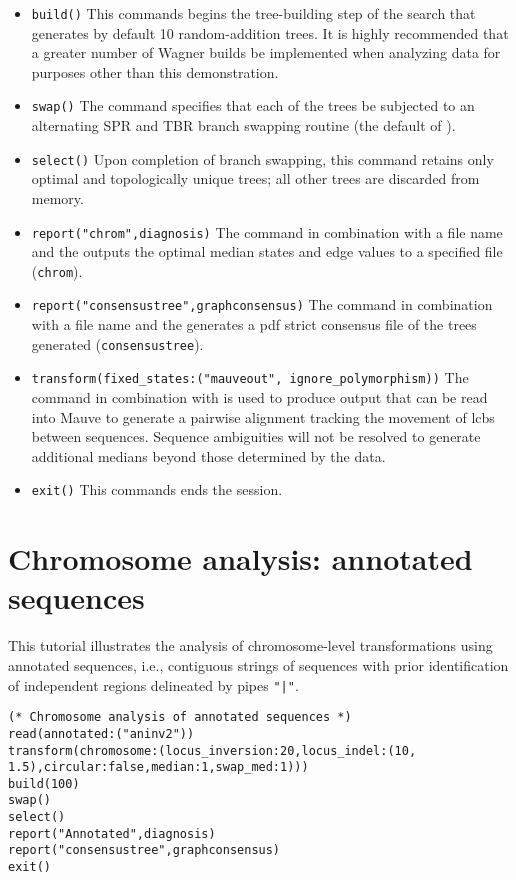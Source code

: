 \begin{itemize}
\item \texttt{build()} This commands begins the tree-building step of the search that generates by default 10 random-addition trees. It is highly recommended that a greater number of Wagner builds be implemented when analyzing data for purposes other than this demonstration.
\item \texttt{swap()} The  command specifies that each of the trees be subjected to an alternating SPR and TBR branch swapping routine (the default of \poy).
\item \texttt{select()} Upon completion of branch swapping, this command retains only optimal and topologically unique trees; all other trees are discarded from memory. 
\item \texttt{report("chrom",diagnosis)}  The  command in combination with a file name and the  outputs the optimal median states and edge values to a specified file (\texttt{chrom}). 
\item \texttt{report("consensustree",graphconsensus)}  The  command in combination with a file name and the  generates a pdf strict consensus file of the trees generated (\texttt{consensustree}). 
\item \texttt{transform(fixed\_states:("mauveout", ignore\_polymorphism))}  The  command in combination with  is used to produce output that can be read into Mauve to generate a pairwise alignment tracking the movement of lcbs between sequences. Sequence ambiguities will not be resolved to generate additional medians beyond those determined by the data.
\item \texttt{exit()} This commands ends the \poy session.
\end{itemize}

\section{Chromosome analysis: annotated sequences}{\label{tutorial 7}}

This tutorial illustrates the analysis of chromosome-level transformations using 
annotated sequences, i.e., contiguous strings of sequences with prior 
identification of independent regions delineated by pipes  \texttt{"|"}. 

\begin{verbatim}
(* Chromosome analysis of annotated sequences *)
read(annotated:("aninv2"))
transform(chromosome:(locus_inversion:20,locus_indel:(10,
1.5),circular:false,median:1,swap_med:1)))
build(100)
swap()
select()
report("Annotated",diagnosis)
report("consensustree",graphconsensus)
exit()
\end{verbatim}

